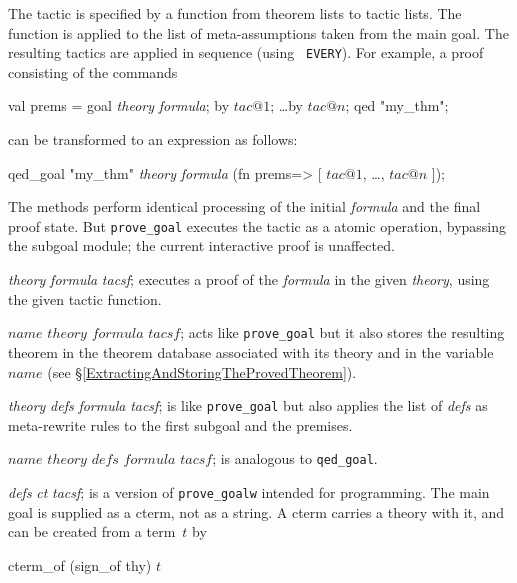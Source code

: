 The tactic is specified by a function from theorem lists to tactic lists.
The function is applied to the list of meta-assumptions taken from
the main goal.  The resulting tactics are applied in sequence (using {\tt
  EVERY}).  For example, a proof consisting of the commands
\begin{ttbox} 
val prems = goal {\it theory} {\it formula};
by \(tac@1\);  \ldots  by \(tac@n\);
qed "my_thm";
\end{ttbox}
can be transformed to an expression as follows:
\begin{ttbox} 
qed_goal "my_thm" {\it theory} {\it formula}
 (fn prems=> [ \(tac@1\), \ldots, \(tac@n\) ]);
\end{ttbox}
The methods perform identical processing of the initial {\it formula} and
the final proof state.  But \texttt{prove_goal} executes the tactic as a
atomic operation, bypassing the subgoal module; the current interactive
proof is unaffected.
%
\begin{ttdescription}
\item[\ttindexbold{prove_goal} {\it theory} {\it formula} {\it tacsf};] 
executes a proof of the {\it formula\/} in the given {\it theory}, using
the given tactic function.

\item[\ttindexbold{qed_goal} $name$ $theory$ $formula$ $tacsf$;] acts
  like \texttt{prove_goal} but it also stores the resulting theorem in the
  theorem database associated with its theory and in the {\ML}
  variable $name$ (see \S\ref{ExtractingAndStoringTheProvedTheorem}).

\item[\ttindexbold{prove_goalw} {\it theory} {\it defs} {\it formula} 
      {\it tacsf};]
is like \texttt{prove_goal} but also applies the list of {\it defs\/} as
meta-rewrite rules to the first subgoal and the premises.

\item[\ttindexbold{qed_goalw} $name$ $theory$ $defs$ $formula$ $tacsf$;]
is analogous to \texttt{qed_goal}.

\item[\ttindexbold{prove_goalw_cterm} {\it defs} {\it ct}
      {\it tacsf};] 
is a version of \texttt{prove_goalw} intended for programming.  The main
goal is supplied as a cterm, not as a string.  A cterm carries a theory with
      it, and can be created from a term~$t$ by
\begin{ttbox}
cterm_of (sign_of thy) \(t\)        
\end{ttbox}
\end{ttdescription}


